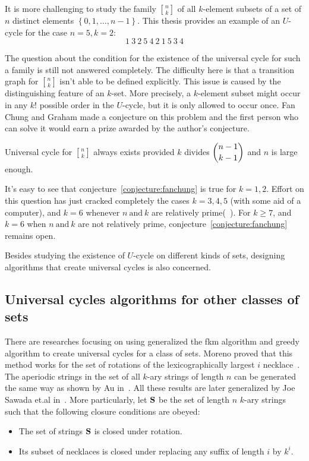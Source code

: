 It is more challenging to study the family ${n \brack k}$ of all $k$-element subsets of a set of $n$ distinct elements $\left\{0,1,\ldots,n-1\right\}$. This thesis provides an example of an $U$-cycle for the case $n=5,k=2$:
\[1\ 3\ 2\ 5\ 4\ 2\ 1\ 5\ 3\ 4\]

The question about the condition for the existence of the universal cycle for such a family is still not answered completely. The difficulty here is that a transition graph for ${n \brack k}$ isn't able to be defined explicitly. This issue is caused by the distinguishing feature of an $k$-set. More precisely, a $k$-element subset might occur in any $k!$ possible order in the $U$-cycle, but it is only allowed to occur once. Fan Chung and Graham made a conjecture on this problem and the first person who can solve it would earn a prize awarded by the author's conjecture.

\begin{conjecture}\label{conjecture:fanchung}
    Universal cycle for ${n \brack k}$ always exists provided $k$ divides $\dbinom{n-1}{k-1}$ and $n$ is large enough.
\end{conjecture}

It's easy to see that conjecture~\ref{conjecture:fanchung} is true for $k=1,2$. Effort on this question has just cracked completely the cases $k=3,4,5$ (with some aid of a computer), and $k=6$ whenever $n\ \mathrm{and}\ k$ are relatively prime(~\cite{hurlbert1994universal,jackson1993universal}). For $k\geq 7$, and $k=6$ when $n\ \mathrm{and}\ k$ are not relatively prime, conjecture~\ref{conjecture:fanchung} remains open. 

Besides studying the existence of $U$-cycle on different kinds of sets, designing algorithms that create universal cycles is also concerned.
\subsection{Universal cycles algorithms for other classes of sets}
There are researches focusing on using generalized the \gls{fkm} algorithm and greedy algorithm to create universal cycles for a class of sets. Moreno proved that this method works for the set of rotations of the lexicographically largest $i$ necklace~\cite{moreno2004theorem}. The aperiodic strings in the set of all $k$-ary strings of length $n$ can be generated the same way as shown by Au in~\cite{au2015generalized}. All these results are later generalized by Joe Sawada et.al in~\cite{sawada2016generalizing}. More particularly, let ${\mathbf S}$ be the set of length $n$ $k$-ary strings such that the following closure conditions are obeyed:
\begin{itemize}
    \item The set of strings ${\mathbf S}$ is closed under rotation.
    \item Its subset of necklaces is closed under replacing any suffix of length $i$ by $k^i$. 
\end{itemize}

